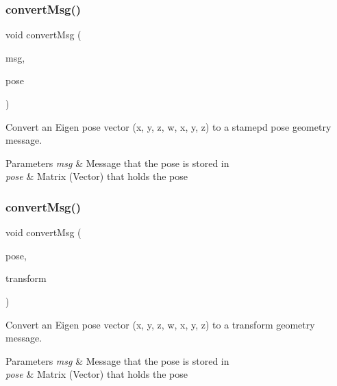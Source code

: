 \subsubsection{\texorpdfstring{convert\+Msg()}{convertMsg()}\hspace{0.1cm}{\footnotesize\ttfamily [9/14]}}
{\footnotesize\ttfamily void convert\+Msg (\begin{DoxyParamCaption}\item[{geometry\+\_\+msgs\+::\+Pose\+Stamped \&}]{msg,  }\item[{Eigen\+::\+Matrix$<$ double, 7, 1 $>$ \&}]{pose }\end{DoxyParamCaption})\hspace{0.3cm}{\ttfamily [inline]}}



Convert an Eigen pose vector (x, y, z, w, x, y, z) to a stamepd pose geometry message. 


\begin{DoxyParams}{Parameters}
{\em msg} & Message that the pose is stored in \\
\hline
{\em pose} & Matrix (Vector) that holds the pose \\
\hline
\end{DoxyParams}
\mbox{\label{group__MultiRobotController_ga45b2bbef58d2c60ff8eeb77d221f2ab7}} 
\subsubsection{\texorpdfstring{convert\+Msg()}{convertMsg()}\hspace{0.1cm}{\footnotesize\ttfamily [10/14]}}
{\footnotesize\ttfamily void convert\+Msg (\begin{DoxyParamCaption}\item[{geometry\+\_\+msgs\+::\+Pose \&}]{pose,  }\item[{geometry\+\_\+msgs\+::\+Transform \&}]{transform }\end{DoxyParamCaption})\hspace{0.3cm}{\ttfamily [inline]}}



Convert an Eigen pose vector (x, y, z, w, x, y, z) to a transform geometry message. 


\begin{DoxyParams}{Parameters}
{\em msg} & Message that the pose is stored in \\
\hline
{\em pose} & Matrix (Vector) that holds the pose \\
\hline
\end{DoxyParams}
\mbox{\label{group__MultiRobotController_gaf99f4d3d714176ee5a3d235ffabb7d3f}} 
